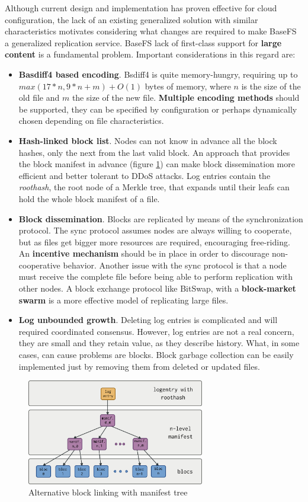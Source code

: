 \documentclass{sig-alternate}
\begin{document}
Although current design and implementation has proven effective for cloud configuration, the lack of an existing generalized solution with similar characteristics motivates considering what changes are required to make BaseFS a generalized replication service. BaseFS lack of first-class support for \textbf{large content} is a fundamental problem. Important considerations in this regard are:  
\begin{itemize}
 \item \textbf{Basdiff4 based encoding}. Bsdiff4 is quite memory-hungry, requiring up to $max(17*n,9*n+m)+O(1)$ bytes of memory, where $n$ is the size of the old file and $m$ the size of the new file. \textbf{Multiple encoding methods} should be supported, they can be specified by configuration or perhaps dynamically chosen depending on file characteristics.
 \item \textbf{Hash-linked block list}. Nodes can not know in advance all the block hashes, only the next from the last valid block. An approach that provides the block manifest in advance (figure \ref{fig:infohash}) can make block dissemination more efficient and better tolerant to DDoS attacks. Log entries contain the \textit{roothash}, the root node of a Merkle tree, that expands until their leafs can hold the whole block manifest of a file.
  \item \textbf{Block dissemination}. Blocks are replicated by means of the synchronization protocol. The sync protocol assumes nodes are always willing to cooperate, but as files get bigger more resources are required, encouraging free-riding. An \textbf{incentive mechanism} should be in place in order to discourage non-cooperative behavior. Another issue with the sync protocol is that a node must receive the complete file before being able to perform replication with other nodes. A block exchange protocol like BitSwap, with a \textbf{block-market swarm} is a more effective model of replicating large files.
  \item \textbf{Log unbounded growth}. Deleting log entries is complicated and will required coordinated consensus\cite{letia2009crdts}. However, log entries are not a real concern, they are small and they retain value, as they describe history. What, in some cases, can cause problems are blocks. Block garbage collection can be easily implemented just by removing them from deleted or updated files.
\end{itemize}

\begin{figure}
\centering
\includegraphics[width=220pt]{imgs/infohash.png}
\caption{Alternative block linking with manifest tree}
\label{fig:infohash}
\end{figure}
\end{document}
